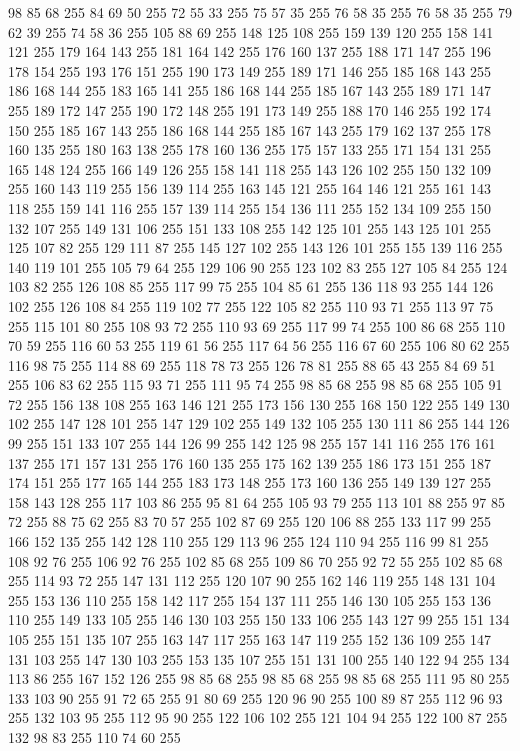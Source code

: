 98 85 68 255 84 69 50 255 72 55 33 255 75 57 35 255 76 58 35 255 76 58 35 255 79 62 39 255 74 58 36 255 105 88 69 255 148 125 108 255 159 139 120 255 158 141 121 255 179 164 143 255 181 164 142 255 176 160 137 255 188 171 147 255 196 178 154 255 193 176 151 255 190 173 149 255 189 171 146 255 185 168 143 255 186 168 144 255 183 165 141 255 186 168 144 255 185 167 143 255 189 171 147 255 189 172 147 255 190 172 148 255 191 173 149 255 188 170 146 255 192 174 150 255 185 167 143 255 186 168 144 255 185 167 143 255 179 162 137 255 178 160 135 255 180 163 138 255 178 160 136 255 175 157 133 255 171 154 131 255 165 148 124 255 166 149 126 255 158 141 118 255 143 126 102 255 150 132 109 255 160 143 119 255 156 139 114 255 163 145 121 255 164 146 121 255 161 143 118 255 159 141 116 255 157 139 114 255 154 136 111 255 152 134 109 255 150 132 107 255 149 131 106 255 151 133 108 255 142 125 101 255 143 125 101 255 125 107 82 255 129 111 87 255 145 127 102 255 143 126 101 255 155 139 116 255
140 119 101 255 105 79 64 255 129 106 90 255 123 102 83 255 127 105 84 255 124 103 82 255 126 108 85 255 117 99 75 255 104 85 61 255 136 118 93 255 144 126 102 255 126 108 84 255 119 102 77 255 122 105 82 255 110 93 71 255 113 97 75 255 115 101 80 255 108 93 72 255 110 93 69 255 117 99 74 255 100 86 68 255 110 70 59 255 116 60 53 255 119 61 56 255 117 64 56 255 116 67 60 255 106 80 62 255 116 98 75 255 114 88 69 255 118 78 73 255 126 78 81 255 88 65 43 255 84 69 51 255 106 83 62 255 115 93 71 255 111 95 74 255 98 85 68 255 98 85 68 255 105 91 72 255 156 138 108 255 163 146 121 255 173 156 130 255 168 150 122 255 149 130 102 255 147 128 101 255 147 129 102 255 149 132 105 255 130 111 86 255 144 126 99 255 151 133 107 255 144 126 99 255 142 125 98 255 157 141 116 255 176 161 137 255 171 157 131 255 176 160 135 255 175 162 139 255 186 173 151 255 187 174 151 255 177 165 144 255 183 173 148 255 173 160 136 255 149 139 127 255 158 143 128 255
117 103 86 255 95 81 64 255 105 93 79 255 113 101 88 255 97 85 72 255 88 75 62 255 83 70 57 255 102 87 69 255 120 106 88 255 133 117 99 255 166 152 135 255 142 128 110 255 129 113 96 255 124 110 94 255 116 99 81 255 108 92 76 255 106 92 76 255 102 85 68 255 109 86 70 255 92 72 55 255 102 85 68 255 114 93 72 255 147 131 112 255 120 107 90 255 162 146 119 255 148 131 104 255 153 136 110 255 158 142 117 255 154 137 111 255 146 130 105 255 153 136 110 255 149 133 105 255 146 130 103 255 150 133 106 255 143 127 99 255 151 134 105 255 151 135 107 255 163 147 117 255 163 147 119 255 152 136 109 255 147 131 103 255 147 130 103 255 153 135 107 255 151 131 100 255 140 122 94 255 134 113 86 255 167 152 126 255 98 85 68 255 98 85 68 255 98 85 68 255 111 95 80 255 133 103 90 255 91 72 65 255 91 80 69 255 120 96 90 255 100 89 87 255 112 96 93 255 132 103 95 255 112 95 90 255 122 106 102 255 121 104 94 255 122 100 87 255 132 98 83 255 110 74 60 255

